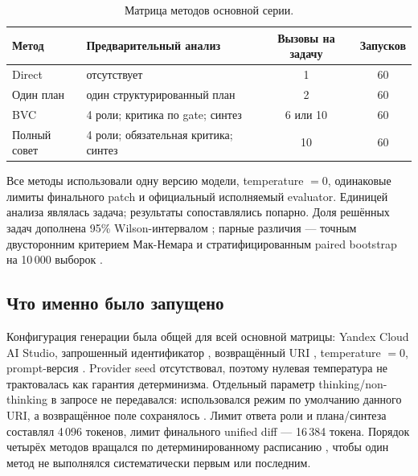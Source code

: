 \documentclass[11pt]{article}
\begin{document}
\begin{table}[H]
\centering
\caption{Матрица методов основной серии.}
\label{tab:methods}
\begin{tabularx}{\textwidth}{@{}lXcc@{}}
\toprule
Метод & Предварительный анализ & Вызовы на задачу & Запусков\\
\midrule
Direct & отсутствует & 1 & 60\\
Один план & один структурированный план & 2 & 60\\
BVC & 4 роли; критика по gate; синтез & 6 или 10 & 60\\
Полный совет & 4 роли; обязательная критика; синтез & 10 & 60\\
\bottomrule
\end{tabularx}
\end{table}

Все методы использовали одну версию модели, temperature \(=0\), одинаковые
лимиты финального patch и официальный исполняемый evaluator. Единицей анализа
являлась задача; результаты сопоставлялись попарно. Доля решённых задач
дополнена 95\% Wilson-интервалом \cite{wilson1927}; парные различия ---
точным двусторонним критерием Мак-Немара \cite{mcnemar1947} и
стратифицированным paired bootstrap на 10\,000 выборок
\cite{efron1993bootstrap}.

\subsection{Что именно было запущено}

Конфигурация генерации была общей для всей основной матрицы: Yandex Cloud AI
Studio, запрошенный идентификатор , возвращённый URI
, temperature \(=0\), prompt-версия
. Provider seed отсутствовал, поэтому нулевая температура
не трактовалась как гарантия детерминизма. Отдельный параметр
thinking/non-thinking в запросе не передавался: использовался режим по умолчанию
данного URI, а возвращённое поле  сохранялось
\cite{yandex2026deepseekv4}. Лимит ответа роли и
плана/синтеза составлял 4\,096 токенов, лимит финального unified diff ---
16\,384 токена. Порядок четырёх методов вращался по детерминированному
расписанию , чтобы один метод не выполнялся
систематически первым или последним.
\end{document}
